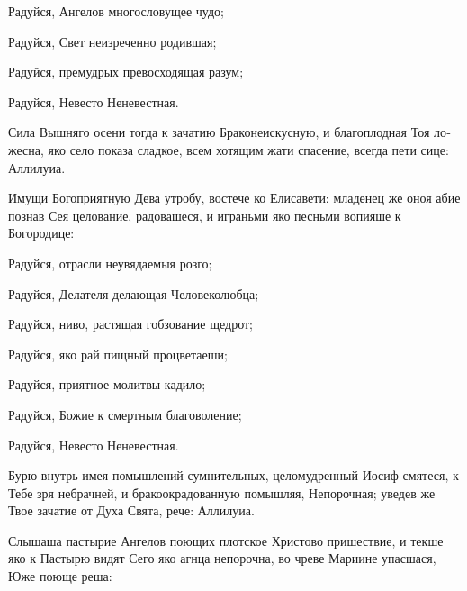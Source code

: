 \begin{russian}

  Радуйся, Ангелов многословущее чудо;


  Радуйся, Свет неизреченно родившая;


  Радуйся, премудрых превосходящая разум;


  Радуйся, Невесто Неневестная.


  \Ierei Сила Вышняго осени тогда к зачатию Браконеискусную, и благоплодная Тоя ложесна, яко село показа сладкое, всем хотящим жати спасение, всегда пети сице: Аллилуиа.


  \Ierei Имущи Богоприятную Дева утробу, востече ко Елисавети: младенец же оноя абие познав Сея целование, радовашеся, и играньми яко песньми вопияше к Богородице:

  \KhorRaduisya Радуйся, отрасли неувядаемыя розго;


  Радуйся, Делателя делающая Человеколюбца;


  Радуйся, ниво, растящая гобзование щедрот;


  Радуйся, яко рай пищный процветаеши;


  Радуйся, приятное молитвы кадило;


  Радуйся, Божие к смертным благоволение;


  Радуйся, Невесто Неневестная.


  \Ierei Бурю внутрь имея помышлений сумнительных, целомудренный Иосиф смятеся, к Тебе зря небрачней, и бракоокрадованную помышляя, Непорочная; уведев же Твое зачатие от Духа Свята, рече: Аллилуиа.


  \Ierei Слышаша пастырие Ангелов поющих плотское Христово пришествие, и текше яко к Пастырю видят Сего яко агнца непорочна, во чреве Мариине упасшася, Юже поюще реша:

\end{russian}
\pagebreak

